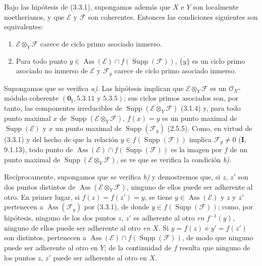 \begin{corollary}[3.3.3]
\label{IV.2.3.3.3-fr}
Bajo las hipótesis de \textup{(3.3.1)}, supongamos además que $X$ e $Y$ son localmente
noetherianos, y que $\mathcal E$ y $\mathcal F$ son coherentes. Entonces las
condiciones siguientes son equivalentes:
\begin{enumerate}
\item[\emph{a)}] $\mathcal E\otimes_Y\mathcal F$ carece de ciclo primo
asociado inmerso.
\item[\emph{b)}] Para todo punto
$y\in\operatorname{Ass}(\mathcal E)\cap f(\operatorname{Supp}(\mathcal F))$,
$\overline{\{y\}}$ es un ciclo primo asociado no inmerso de $\mathcal E$ y
$\mathcal F_y$ carece de ciclo primo asociado inmerso.
\end{enumerate}
\end{corollary}

Supongamos que se verifica \emph{a)}. Las hipótesis implican que
$\mathcal E\otimes_Y\mathcal F$ es un $\mathcal O_X$-módulo coherente
$(\mathbf{0}_{\mathrm I},5.3.11\text{ y }5.3.5)$; sus ciclos primos asociados son,
por tanto, las componentes irreducibles de
$\operatorname{Supp}(\mathcal E\otimes_Y\mathcal F)$ (3.1.4) y, para todo
punto maximal $x$ de $\operatorname{Supp}(\mathcal E\otimes_Y\mathcal F)$,
$f(x)=y$ es un punto maximal de $\operatorname{Supp}(\mathcal E)$ y $x$ un
punto maximal de $\operatorname{Supp}(\mathcal F_y)$ (2.5.5). Como, en virtud
de (3.3.1) y del hecho de que la relación
$y\in f(\operatorname{Supp}(\mathcal F))$ implica $\mathcal F_y\ne0$
(\textbf I, 9.1.13), todo punto de
$\operatorname{Ass}(\mathcal E)\cap f(\operatorname{Supp}(\mathcal F))$ es la
imagen por $f$ de un punto maximal de
$\operatorname{Supp}(\mathcal E\otimes_Y\mathcal F)$, se ve que se verifica la
condición \emph{b)}.

Recíprocamente, supongamos que se verifica \emph{b)} y demostremos que, si
$z$, $z'$ son dos puntos distintos de
$\operatorname{Ass}(\mathcal E\otimes_Y\mathcal F)$, ninguno de ellos puede
ser adherente al otro. En primer lugar, si $f(z)=f(z')=y$, se tiene
$y\in\operatorname{Ass}(\mathcal E)$ y $z$ y $z'$ pertenecen a
$\operatorname{Ass}(\mathcal F_y)$ por (3.3.1), de donde
$y\in f(\operatorname{Supp}(\mathcal F))$; como, por hipótesis, ninguno de los
dos puntos $z$, $z'$ es adherente al otro \emph{en} $f^{-1}(y)$, ninguno de
ellos puede ser adherente al otro \emph{en} $X$. Si $y=f(z)$ e $y'=f(z')$ son
distintos, pertenecen a
$\operatorname{Ass}(\mathcal E)\cap f(\operatorname{Supp}(\mathcal F))$, de
modo que ninguno puede ser adherente al otro en $Y$; de la continuidad de $f$
resulta que ninguno de los puntos $z$, $z'$ puede ser adherente al otro en $X$.

